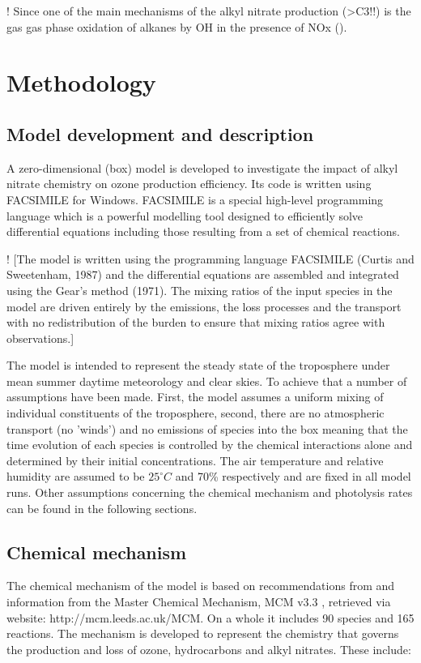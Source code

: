 \documentclass[11pt,a4paper]{article}
\begin{document}
! Since one of the main mechanisms of the alkyl nitrate production (>C3!!) is the gas gas phase oxidation of alkanes by OH in the presence of NOx (\citep{Newland2013}).

\section{Methodology} \label{sec:method}
\subsection{Model development and description}
A zero-dimensional (box) model is developed to investigate the impact of alkyl nitrate chemistry on ozone production efficiency. Its code is written using FACSIMILE for Windows. FACSIMILE is a special high-level programming language which is a powerful modelling tool designed to efficiently solve differential equations including those resulting from a set of chemical reactions.

! \citep{Newland2013}
[The model is written using the programming language FACSIMILE (Curtis and Sweetenham, 1987) and the differential equations are assembled and integrated using the Gear’s method (1971). The mixing ratios of the input species in the model are driven entirely by the emissions, the loss processes and the transport with no redistribution of the burden to ensure that mixing ratios agree with observations.]

The model is intended to represent the steady state of the troposphere under mean summer daytime meteorology and clear skies. To achieve that a number of assumptions have been made. First, the model assumes a uniform mixing of individual constituents of the troposphere, second, there are no atmospheric transport (no 'winds') and no emissions of species into the box meaning that the time evolution of each species is controlled by the chemical interactions alone and determined by their initial concentrations. The air temperature and relative humidity are assumed to be $25^{\circ}C$ and 70\% respectively and are fixed in all model runs. Other assumptions concerning the chemical mechanism and photolysis rates can be found in the following sections.

\subsection{Chemical mechanism}
The chemical mechanism of the model is based on recommendations from \citep{Atkinson2004} and information from the Master Chemical Mechanism, MCM v3.3 \citep{Jenkin1997,Saunders2003}, retrieved via website: http://mcm.leeds.ac.uk/MCM. On a whole it includes 90 species and 165 reactions. The mechanism is developed to represent the chemistry that governs the production and loss of ozone, hydrocarbons and alkyl nitrates. These include:
\end{document}
